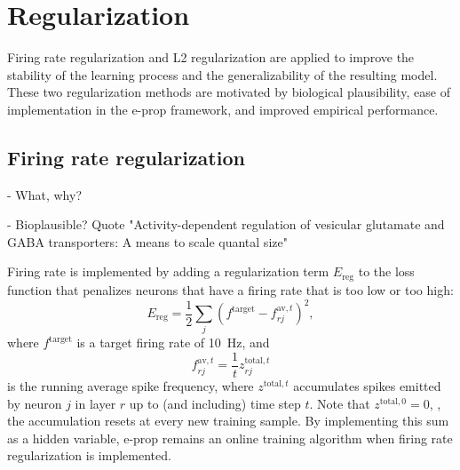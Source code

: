 \section{Regularization}

	Firing rate regularization and L2 regularization are applied to improve the stability of the learning process and the generalizability of the resulting model.
	These two regularization methods are motivated by biological plausibility, ease of implementation in the e-prop framework, and improved empirical performance.

	\subsection{Firing rate regularization}
		\begin{tcolorbox}[colback=orange]
		- What, why?

		- Bioplausible? Quote "Activity-dependent regulation of vesicular glutamate and GABA transporters: A means to scale quantal size"

		\end{tcolorbox}
		Firing rate is implemented by adding a regularization term $E_\text{reg}$ to the loss function that penalizes neurons that have a firing rate that is too low or too high:
		\begin{equation}
			E_\text{reg} = \frac{1}{2}\sum_j\left(f^\text{target} - f^{\text{av}, t}_{rj}\right)^2,
		\end{equation}
		where $f^\text{target}$ is a target firing rate of \SI{10}{\Hz}, and
		\begin{equation}
		f^{\text{av},t}_{rj} = \frac{1}{t} z^{\text{total},t}_{rj}
		\end{equation}
		is the running average spike frequency, where $z^{\text{total},t}$ accumulates spikes emitted by neuron $j$ in layer $r$ up to (and including) time step $t$.
		Note that $z^{\text{total},0} = 0$, \ie, the accumulation resets at every new training sample.
		By implementing this sum as a hidden variable, e-prop remains an online training algorithm when firing rate regularization is implemented.

